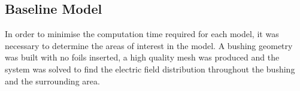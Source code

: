 \subsection{Baseline Model}
In order to minimise the computation time required for each model, it was necessary to determine the areas of interest in the model.
A bushing geometry was built with no foils inserted, a high quality mesh was produced and the system was solved to find the electric field distribution throughout the bushing and the surrounding area.
\begin{figure}[!htb]
  \centering
\end{figure}
